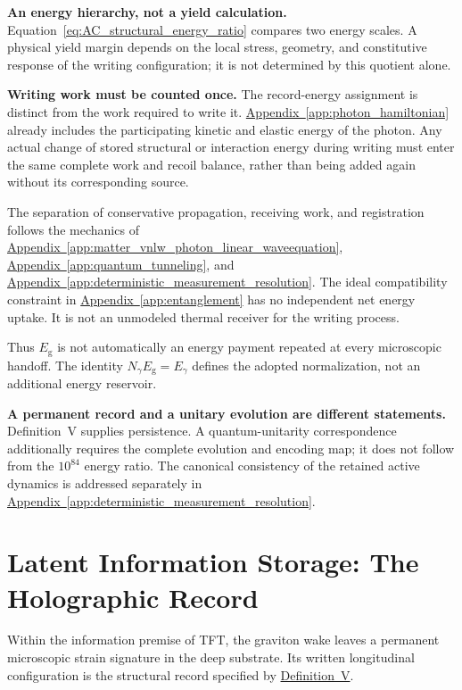 \noindent\textbf{An energy hierarchy, not a yield calculation.}
Equation~\eqref{eq:AC_structural_energy_ratio} compares two energy scales. A physical yield margin depends on the local stress, geometry, and constitutive response of the writing configuration; it is not determined by this quotient alone.

\medskip
\noindent\textbf{Writing work must be counted once.}
The record-energy assignment is distinct from the work required to write it. \hyperref[app:photon_hamiltonian]{Appendix~\ref*{app:photon_hamiltonian}} already includes the participating kinetic and elastic energy of the photon. Any actual change of stored structural or interaction energy during writing must enter the same complete work and recoil balance, rather than being added again without its corresponding source.

The separation of conservative propagation, receiving work, and registration follows the mechanics of \hyperref[app:matter_vnlw_photon_linear_waveequation]{Appendix~\ref*{app:matter_vnlw_photon_linear_waveequation}}, \hyperref[app:quantum_tunneling]{Appendix~\ref*{app:quantum_tunneling}}, and \hyperref[app:deterministic_measurement_resolution]{Appendix~\ref*{app:deterministic_measurement_resolution}}. The ideal compatibility constraint in \hyperref[app:entanglement]{Appendix~\ref*{app:entanglement}} has no independent net energy uptake. It is not an unmodeled thermal receiver for the writing process.

Thus $E_{\mathrm g}$ is not automatically an energy payment repeated at every microscopic handoff. The identity $N_\gamma E_{\mathrm g}=E_\gamma$ defines the adopted normalization, not an additional energy reservoir.

\medskip
\noindent\textbf{A permanent record and a unitary evolution are different statements.}
Definition~V supplies persistence. A quantum-unitarity correspondence additionally requires the complete evolution and encoding map; it does not follow from the $10^{84}$ energy ratio. The canonical consistency of the retained active dynamics is addressed separately in \hyperref[app:deterministic_measurement_resolution]{Appendix~\ref*{app:deterministic_measurement_resolution}}.

\section{Latent Information Storage: The Holographic Record}
\label{sec:AC_holographic_record}

Within the information premise of TFT, the graviton wake leaves a permanent microscopic strain signature in the deep substrate. Its written longitudinal configuration is the structural record specified by \hyperref[def:definition_five]{Definition~V}.

